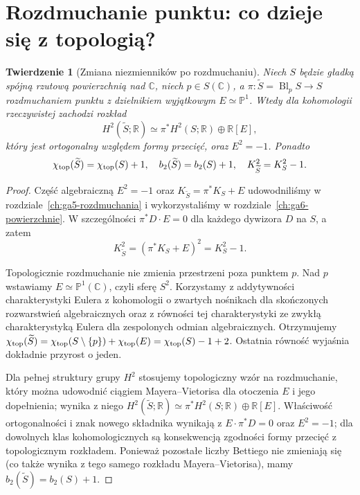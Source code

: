 \documentclass[11pt,a4paper,openany]{report}
\numberwithin{equation}{section}
\theoremstyle{plain}
\newtheorem{twierdzenie}{Twierdzenie}[section]
\theoremstyle{definition}
\theoremstyle{remark}
\newcommand{\R}{\mathbb R}
\newcommand{\C}{\mathbb C}
\newcommand{\PP}{\mathbb P}
\begin{document}
\section{Rozdmuchanie punktu: co dzieje się z topologią?}
\label{sec:ga10-blowup}

\begin{twierdzenie}[Zmiana niezmienników po rozdmuchaniu]
\label{tw:ga10-blowup}
Niech $S$ będzie gładką spójną rzutową powierzchnią nad $\C$,
niech $p\in S(\C)$, a $\pi\colon\widetilde S=\operatorname{Bl}_pS\to S$
rozdmuchaniem punktu z dzielnikiem wyjątkowym $E\simeq\PP^1$.
Wtedy dla kohomologii rzeczywistej zachodzi rozkład
\[
 H^2(\widetilde S;\R)\simeq\pi^*H^2(S;\R)\oplus\R[E],
\]
który jest ortogonalny względem formy przecięć, oraz
$E^2=-1$. Ponadto
\[
 \chi_{\rm top}(\widetilde S)=\chi_{\rm top}(S)+1,
 \quad b_2(\widetilde S)=b_2(S)+1,
 \quad K_{\widetilde S}^2=K_S^2-1.
\]
\end{twierdzenie}
\begin{proof}
Część algebraiczną $E^2=-1$ oraz
$K_{\widetilde S}=\pi^*K_S+E$ udowodniliśmy
w rozdziale~\ref{ch:ga5-rozdmuchania} i
wykorzystaliśmy w rozdziale~\ref{ch:ga6-powierzchnie}.
W szczególności $\pi^*D\cdot E=0$ dla każdego
dywizora $D$ na $S$, a zatem
\[
 K_{\widetilde S}^2=(\pi^*K_S+E)^2=K_S^2-1.
\]

Topologicznie rozdmuchanie nie zmienia przestrzeni poza
punktem $p$. Nad $p$ wstawiamy $E\simeq\PP^1(\C)$,
czyli sferę $S^2$. Korzystamy z addytywności charakterystyki Eulera
z kohomologii o zwartych nośnikach dla skończonych
rozwarstwień algebraicznych oraz z równości tej
charakterystyki ze zwykłą charakterystyką Eulera
dla zespolonych odmian algebraicznych. Otrzymujemy
$\chi_{\rm top}(\widetilde S)
=\chi_{\rm top}(S\setminus\{p\})+\chi_{\rm top}(E)
=\chi_{\rm top}(S)-1+2$.
Ostatnia równość wyjaśnia dokładnie przyrost o jeden.

Dla pełnej struktury grupy $H^2$ stosujemy topologiczny
wzór na rozdmuchanie, który można udowodnić
ciągiem Mayera--Vietorisa dla otoczenia $E$
i jego dopełnienia; wynika z niego
$H^2(\widetilde S;\R)\simeq\pi^*H^2(S;\R)\oplus\R[E]$.
Właściwość ortogonalności i znak nowego składnika
wynikają z $E\cdot\pi^*D=0$ oraz $E^2=-1$;
dla dowolnych klas kohomologicznych są konsekwencją
zgodności formy przecięć z topologicznym rozkładem.
Ponieważ pozostałe liczby Bettiego nie zmieniają się
(co także wynika z tego samego rozkładu Mayera--Vietorisa),
mamy $b_2(\widetilde S)=b_2(S)+1$.
\end{proof}
\end{document}
